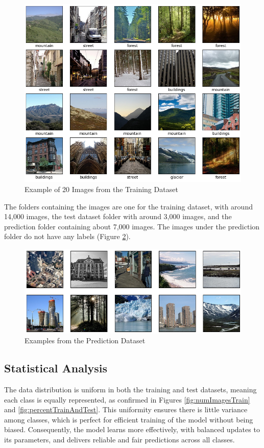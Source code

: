 \documentclass[conference]{IEEEtran}
\begin{document}
\begin{figure}[H]
    \centering
    \includegraphics[width=1\linewidth]{images/TestImages20.png}
    \caption{Example of 20 Images from the Training Dataset}
    \label{fig:trainingData}
\end{figure}

The folders containing the images are one for the training dataset, with around 14,000 images, the test dataset folder with around 3,000 images, and the prediction folder containing about 7,000 images. The images under the prediction folder do not have any labels (Figure \ref{fig:predictData}).

\begin{figure}[H]
    \centering
    \includegraphics[width=1\linewidth]{images/predictionData.png}
    \caption{Examples from the Prediction Dataset}
    \label{fig:predictData}
\end{figure}

\subsection{Statistical Analysis}
The data distribution is uniform in both the training and test datasets, meaning each class is equally represented, as confirmed in Figures \ref{fig:numImagesTrain} and \ref{fig:percentTrainAndTest}. This uniformity ensures there is little variance among classes, which is perfect for efficient training of the model without being biased. Consequently, the model learns more effectively, with balanced updates to its parameters, and delivers reliable and fair predictions across all classes.
\end{document}
